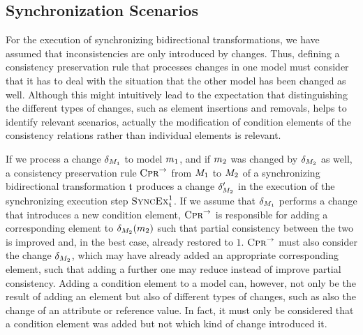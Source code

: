 \subsection{Synchronization Scenarios}

For the execution of synchronizing bidirectional transformations, we have assumed that inconsistencies are only introduced by changes.
Thus, defining a consistency preservation rule that processes changes in one model must consider that it has to deal with the situation that the other model has been changed as well.
Although this might intuitively lead to the expectation that distinguishing the different types of changes, such as element insertions and removals, helps to identify relevant scenarios, actually the modification of condition elements of the consistency relations rather than individual elements is relevant.

If we process a change $\change{\metamodel{M}{1}}$ to model $\model{m}{1}$, and if $\model{m}{2}$ was changed by $\change{\metamodel{M}{2}}$ as well,
a consistency preservation rule $\textsc{Cpr}_{}^{\rightarrow}$ from $\metamodel{M}{1}$ to $\metamodel{M}{2}$ of a synchronizing bidirectional transformation $\transformation{t}$ produces a change $\change{\metamodel{M}{2}}'$ in the execution of the synchronizing execution step $\function{SyncEx}_{\transformation{t}}^1$.
If we assume that $\change{\metamodel{M}{1}}$ performs a change that introduces a new condition element, $\textsc{Cpr}_{}^{\rightarrow}$ is responsible for adding a corresponding element to $\change{\metamodel{M}{2}}(\model{m}{2})$ such that partial consistency between the two is improved and, in the best case, already restored to $1$.
$\textsc{Cpr}_{}^{\rightarrow}$ must also consider the change $\change{\metamodel{M}{2}}$, which may have already added an appropriate corresponding element, such that adding a further one may reduce instead of improve partial consistency.
Adding a condition element to a model can, however, not only be the result of adding an element but also of different types of changes, such as also the change of an attribute or reference value.
In fact, it must only be considered that a condition element was added but not which kind of change introduced it.


